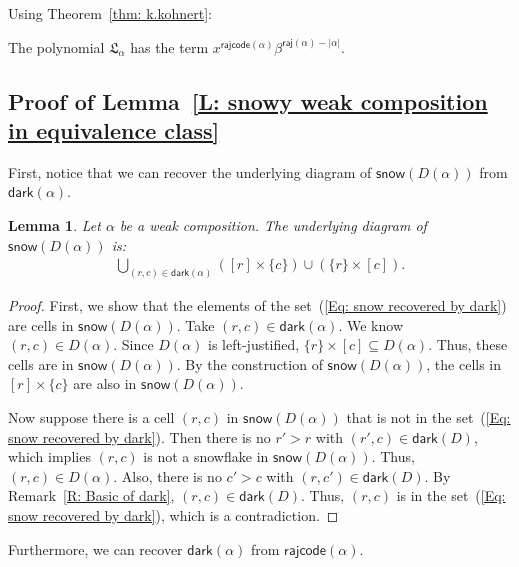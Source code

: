 \documentclass[10pt]{amsart}
\theoremstyle{plain}
\theoremstyle{plain}
\theoremstyle{definition}
\theoremstyle{definition}
\theoremstyle{definition}
\theoremstyle{plain}
\theoremstyle{plain}
\theoremstyle{plain}
\newtheorem{lemma}[lemma]{Lemma}
\theoremstyle{plain}
\theoremstyle{plain}
\theoremstyle{remark}
\theoremstyle{remark}
\theoremstyle{plain}
\theoremstyle{plain}
\newenvironment{manuallemma}[1]{
  \renewcommand\themanuallemmainner{#1}
  \manuallemmainner
}{\endmanuallemmainner}
\newcommand{\fL}{\mathfrak{L}}
\newcommand{\fLb}{\fL}
\newcommand{\dark}{\mathsf{dark}}
\newcommand{\snow}{\mathsf{snow}}
\newcommand{\rajcode}{\mathsf{rajcode}}
\newcommand{\raj}{\mathsf{raj}}
\begin{document}
Using Theorem~\ref{thm: k.kohnert}:

\begin{manuallemma}{\ref{L: Top Las 1}}
The polynomial $\fLb_\alpha$ has the term $x^{\rajcode(\alpha)} \beta^{\raj(\alpha) - |\alpha|}$.
\end{manuallemma} 

\subsection{Proof of Lemma~\ref{L: snowy weak composition in equivalence class}}
\label{SS: equivalence}

First, notice that we can recover the underlying diagram of $\snow(D(\alpha))$
from $\dark(\alpha)$.

\begin{lemma}
\label{L: dark recovers snow}
Let $\alpha$ be a weak composition. 
The underlying diagram of $\snow(D(\alpha))$
is:
\begin{align}
\label{Eq: snow recovered by dark}
\bigcup_{(r,c) \in \dark(\alpha)} ([r] \times \{c\}) \cup (\{r\} \times [c]).
\end{align}
\end{lemma}
\begin{proof}
First, we show that the elements of the set~(\ref{Eq: snow recovered by dark})
are cells in $\snow(D(\alpha))$.
Take $(r,c) \in \dark(\alpha)$.
We know $(r,c) \in D(\alpha)$.
Since $D(\alpha)$ is left-justified, 
$\{r\} \times [c] \subseteq D(\alpha)$.
Thus, these cells are in $\snow(D(\alpha))$.
By the construction of $\snow(D(\alpha))$,
the cells in~$[r] \times \{c\}$ are also 
in $\snow(D(\alpha))$.

Now suppose there is a cell $(r, c)$ 
in $\snow(D(\alpha))$
that is not in the 
set~(\ref{Eq: snow recovered by dark}).
Then there is no $r' > r$ with $(r', c) \in \dark(D)$,
which implies $(r,c)$ is not a snowflake 
in $\snow(D(\alpha))$.
Thus, $(r,c) \in D(\alpha)$.
Also, there is no $c' > c$ with $(r, c') \in \dark(D)$.
By Remark~\ref{R: Basic of dark},
$(r,c) \in \dark(D)$.
Thus, $(r, c)$ is in the 
set~(\ref{Eq: snow recovered by dark}),
which is a contradiction.
\end{proof}

Furthermore, 
we can recover $\dark(\alpha)$ from $\rajcode(\alpha)$.
\end{document}
